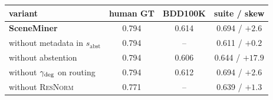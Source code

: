 \begin{tabular}{lccc}
\toprule
variant & human GT & BDD100K & suite / skew\\
\midrule
\textbf{SceneMiner} & 0.794 & 0.614 & 0.694 / $+2.6$\\
without metadata in $s_{\mathrm{abst}}$ & 0.794 & -- & 0.611 / $+0.2$\\
without abstention & 0.794 & 0.606 & 0.644 / $+17.9$\\
without $\gamma_{\mathrm{deg}}$ on routing & 0.794 & 0.612 & 0.694 / $+2.6$\\
without \textsc{ResNorm} & 0.771 & -- & 0.639 / $+1.3$\\
\bottomrule
\end{tabular}
